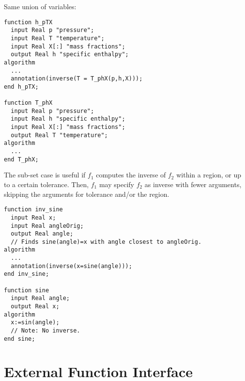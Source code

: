 \begin{example}
Same union of variables:
\begin{lstlisting}[language=modelica]
function h_pTX
  input Real p "pressure";
  input Real T "temperature";
  input Real X[:] "mass fractions";
  output Real h "specific enthalpy";
algorithm
  ...
  annotation(inverse(T = T_phX(p,h,X)));
end h_pTX;

function T_phX
  input Real p "pressure";
  input Real h "specific enthalpy";
  input Real X[:] "mass fractions";
  output Real T "temperature";
algorithm
  ...
end T_phX;
\end{lstlisting}
\end{example}

The sub-set case is useful if $f_1$ computes the inverse of $f_2$ within a region, or up to a certain tolerance.
Then, $f_1$ may specify $f_2$ as inverse with fewer arguments, skipping the arguments for tolerance and/or the region.

\begin{example}

\begin{lstlisting}[language=modelica]
function inv_sine
  input Real x;
  input Real angleOrig;
  output Real angle;
  // Finds sine(angle)=x with angle closest to angleOrig.
algorithm
  ...
  annotation(inverse(x=sine(angle)));
end inv_sine;

function sine
  input Real angle;
  output Real x;
algorithm
  x:=sin(angle);
  // Note: No inverse.
end sine;
\end{lstlisting}
\end{example}
\section{External Function Interface}

